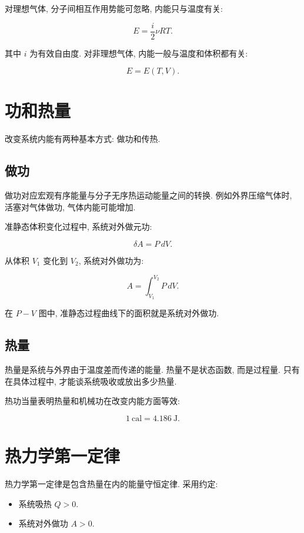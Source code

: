 \documentclass[
  a4paper,
]{ctexrep}
\providecommand{\tightlist}{%
  \setlength{\itemsep}{0pt}\setlength{\parskip}{0pt}}
\begin{document}
对理想气体, 分子间相互作用势能可忽略, 内能只与温度有关:

\[
E=\frac{i}{2}\nu RT.
\]

其中 \(i\) 为有效自由度. 对非理想气体, 内能一般与温度和体积都有关:

\[
E=E(T,V).
\]

\section{功和热量}\label{ux529fux548cux70edux91cf}

改变系统内能有两种基本方式: 做功和传热.

\subsection{做功}\label{ux505aux529f}

做功对应宏观有序能量与分子无序热运动能量之间的转换. 例如外界压缩气体时,
活塞对气体做功, 气体内能可能增加.

准静态体积变化过程中, 系统对外做元功:

\[
\delta A=P\,dV.
\]

从体积 \(V_1\) 变化到 \(V_2\), 系统对外做功为:

\[
A=\int_{V_1}^{V_2}P\,dV.
\]

在 \(P-V\) 图中, 准静态过程曲线下的面积就是系统对外做功.

\subsection{热量}\label{ux70edux91cf}

热量是系统与外界由于温度差而传递的能量. 热量不是状态函数, 而是过程量.
只有在具体过程中, 才能谈系统吸收或放出多少热量.

热功当量表明热量和机械功在改变内能方面等效:

\[
1\ \mathrm{cal}=4.186\ \mathrm{J}.
\]

\section{热力学第一定律}\label{ux70edux529bux5b66ux7b2cux4e00ux5b9aux5f8b}

热力学第一定律是包含热量在内的能量守恒定律. 采用约定:

\begin{itemize}
\tightlist
\item
  系统吸热 \(Q>0\).
\item
  系统对外做功 \(A>0\).
\end{itemize}
\end{document}
